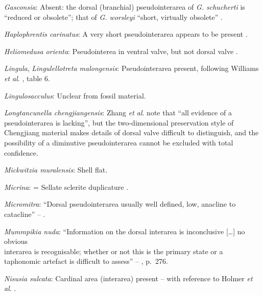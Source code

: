 \documentclass[openany]{book}
\theoremstyle{definition}
\theoremstyle{definition}
\theoremstyle{definition}
\theoremstyle{remark}
\begin{document}
\hypertarget{Gasconsia-coding-86}{}
\emph{Gasconsia}: Absent: the dorsal (branchial) pseudointerarea of
\emph{G. schucherti} is ``reduced or obsolete''; that of \emph{G.
worsleyi} ``short, virtually obsolete'' \citep{Hanken1985Thetaxonomy}.

\hypertarget{Haplophrentis_carinatus-coding-86}{}
\emph{Haplophrentis carinatus}: A very short pseudointerarea appears to
be present \citep{Moysiuk2017Hyolithsare}.

\hypertarget{Heliomedusa_orienta-coding-86}{}
\emph{Heliomedusa orienta}: Pseudointerea in ventral valve, but not
dorsal valve \citep[2007]{Williams2000LinguliformeaCraniiformea}.

\hypertarget{Lingula-coding-86}{}
\emph{Lingula}, \emph{Lingulellotreta malongensis}: Pseudointerarea
present, following Williams \emph{et al}.
\citeyearpar{Williams2000LinguliformeaCraniiformea}, table 6.

\hypertarget{Lingulosacculus-coding-86}{}
\emph{Lingulosacculus}: Unclear from fossil material.

\hypertarget{Longtancunella_chengjiangensis-coding-86}{}
\emph{Longtancunella chengjiangensis}: Zhang \emph{et al}.
\citeyearpar{Zhang2011Theexceptionally} note that ``all evidence of a
pseudointerarea is lacking'', but the two-dimensional preservation style
of Chengjiang material makes details of dorsal valve difficult to
distinguish, and the possibility of a diminutive pseudointerarea cannot
be excluded with total confidence.

\hypertarget{Mickwitzia_muralensis-coding-86}{}
\emph{Mickwitzia muralensis}: Shell flat.

\hypertarget{Micrina-coding-86}{}
\emph{Micrina}: = Sellate sclerite duplicature
\citep{Holmer2008TheEarly}.

\hypertarget{Micromitra-coding-86}{}
\emph{Micromitra}: ``Dorsal pseudointerarea usually well defined, low,
anacline to catacline'' --
\citet{Williams2000LinguliformeaCraniiformea}.

\hypertarget{Mummpikia_nuda-coding-86}{}
\emph{Mummpikia nuda}: ``Information on the dorsal interarea is
inconclusive {[}\ldots{}{]} no obvious\\
interarea is recognisable; whether or not this is the primary state or a
taphonomic artefact is difficult to assess'' --
\citet{Balthasar2008iMummpikia}, p.~276.

\hypertarget{Nisusia_sulcata-coding-86}{}
\emph{Nisusia sulcata}: Cardinal area (interarea) present -- with
reference to Holmer \emph{et al}.
\citeyearpar{Holmer2018Evolutionarysignificance}.
\end{document}
